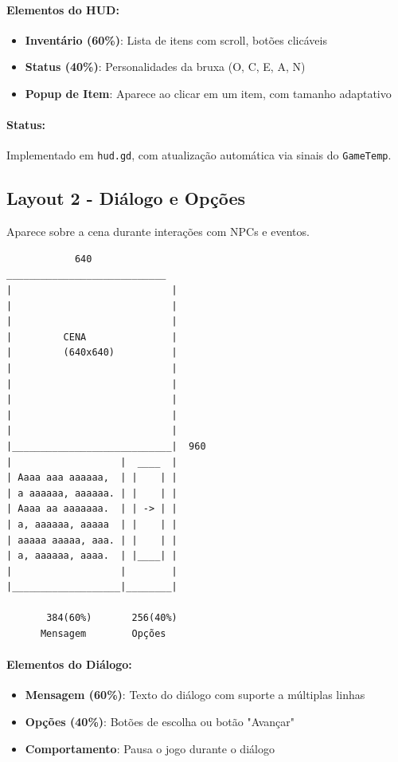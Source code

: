\documentclass[12pt]{article}
\begin{document}
\paragraph{Elementos do HUD:}
\begin{itemize}
    \item \textbf{Inventário (60\%)}: Lista de itens com scroll, botões clicáveis
    \item \textbf{Status (40\%)}: Personalidades da bruxa (O, C, E, A, N)
    \item \textbf{Popup de Item}: Aparece ao clicar em um item, com tamanho adaptativo
\end{itemize}

\paragraph{Status:} Implementado em \texttt{hud.gd}, com atualização automática via sinais do \texttt{GameTemp}.

\subsection{Layout 2 - Diálogo e Opções}

Aparece sobre a cena durante interações com NPCs e eventos.

\begin{verbatim}
            640
____________________________
|                            |
|                            |
|                            |
|         CENA               |
|         (640x640)          |
|                            |
|                            |
|                            |
|                            |
|                            |
|____________________________|  960
|                   |  ____  |
| Aaaa aaa aaaaaa,  | |    | |
| a aaaaaa, aaaaaa. | |    | |
| Aaaa aa aaaaaaa.  | | -> | |
| a, aaaaaa, aaaaa  | |    | |
| aaaaa aaaaa, aaa. | |    | |
| a, aaaaaa, aaaa.  | |____| |
|                   |        |
|___________________|________|

       384(60%)       256(40%)
      Mensagem        Opções
\end{verbatim}

\paragraph{Elementos do Diálogo:}
\begin{itemize}
    \item \textbf{Mensagem (60\%)}: Texto do diálogo com suporte a múltiplas linhas
    \item \textbf{Opções (40\%)}: Botões de escolha ou botão "Avançar"
    \item \textbf{Comportamento}: Pausa o jogo durante o diálogo
\end{itemize}
\end{document}
